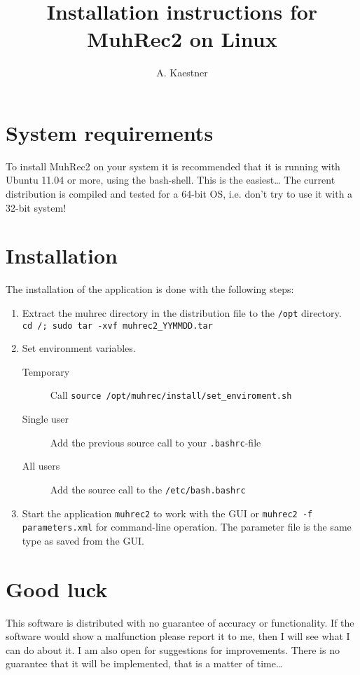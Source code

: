 \documentclass[a4paper,10pt]{scrartcl}
\title{Installation instructions for MuhRec2 on Linux}
\author{A. Kaestner}
\begin{document}
\maketitle

\section{System requirements}
To install MuhRec2 on your system it is recommended that it is running with
Ubuntu 11.04 or more, using the bash-shell. This is the easiest\ldots
The current distribution is compiled and tested for a 64-bit OS, i.e. don't try
to use it with a 32-bit system!

\section{Installation}
The installation of the application is done with the following steps:
\begin{enumerate}
 \item Extract the muhrec directory in the distribution file to the \verb+/opt+
directory. \\
\verb+cd /; sudo tar -xvf muhrec2_YYMMDD.tar+
\item Set environment variables.
\begin{description}
 \item[Temporary] Call \verb+source /opt/muhrec/install/set_enviroment.sh+
 \item[Single user] Add the previous source call to your \verb+.bashrc+-file
\item[All users] Add the source call to the \verb+/etc/bash.bashrc+
\end{description}
\item Start the application \verb+muhrec2+ to work with the GUI or
\verb+muhrec2 -f parameters.xml+ for command-line operation. The parameter file
is the same type as saved from the GUI.
\end{enumerate}

\section{Good luck}
This software is distributed with no guarantee of accuracy or functionality.
If the software would show a malfunction please report it to me, then I will see
what I can do about it. I am also open for suggestions for improvements. There
is no guarantee that it will be implemented, that is a matter of time\ldots 
\end{document}
